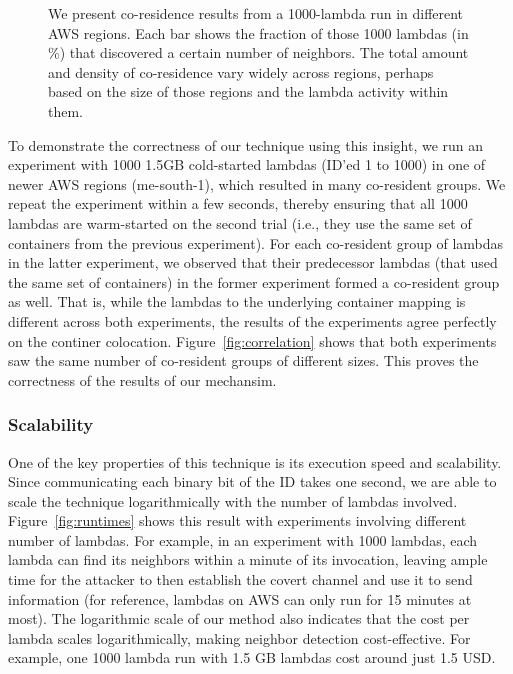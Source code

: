 \begin{figure}[!t]
\begin{subfigure}{.33\textwidth}
  \end{subfigure}
  \caption{We present co-residence results from a 1000-lambda run in different AWS regions. Each bar shows the fraction 
  of those 1000 lambdas (in \%) that discovered a certain number of neighbors. The total amount and density of co-residence 
  vary widely across regions, perhaps based on the size of those regions and the lambda activity within them. }
  \label{fig:awsregions}
  \end{figure}

To demonstrate the correctness of our technique using this insight, we run an
experiment with 1000 1.5GB cold-started lambdas (ID'ed 1 to 1000) in one of
newer AWS regions (me-south-1), which resulted in many co-resident groups.
We repeat the experiment within a few seconds, thereby ensuring that all 1000
lambdas are warm-started on the second trial (i.e., they use the same set of
containers from the previous experiment).  For each co-resident group of lambdas
in the latter experiment, we observed that their predecessor lambdas (that used
the same set of containers) in the former experiment formed a co-resident group
as well. That is, while the lambdas to the underlying container mapping is
different across both experiments, the results of the experiments agree
perfectly on the continer colocation. Figure~\ref{fig:correlation} shows that
both experiments saw the same number of co-resident groups of different sizes.
This proves the correctness of the results of our mechansim.

\subsubsection{Scalability}
One of the key properties of this technique is its execution speed and
scalability. Since communicating each binary bit of the ID takes one second, we
are able to scale the technique logarithmically with the number of lambdas
involved. Figure~\ref{fig:runtimes} shows this result with experiments
involving different number of lambdas. For example, in an experiment with 1000
lambdas, each lambda can find its neighbors within a minute of its invocation,
leaving ample time for the attacker to then establish the covert channel and use
it to send information (for reference, lambdas on AWS can only run for 15
minutes at most).  The logarithmic scale of our method also indicates that the
cost per lambda scales logarithmically, making neighbor detection
cost-effective.  For example, one 1000 lambda run with 1.5 GB lambdas cost
around just 1.5 USD. 



